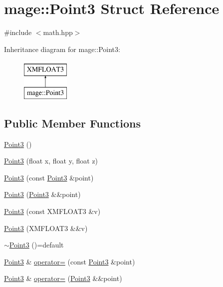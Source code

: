 \hypertarget{structmage_1_1_point3}{}\section{mage\+:\+:Point3 Struct Reference}
\label{structmage_1_1_point3}


{\ttfamily \#include $<$math.\+hpp$>$}

Inheritance diagram for mage\+:\+:Point3\+:\begin{figure}[H]
\begin{center}
\leavevmode
\includegraphics[height=2.000000cm]{structmage_1_1_point3}
\end{center}
\end{figure}
\subsection*{Public Member Functions}
\begin{DoxyCompactItemize}
\item 
\hyperlink{structmage_1_1_point3_a2675c303e54c6047520bc1a298c7fef1}{Point3} ()
\item 
\hyperlink{structmage_1_1_point3_a754210fa30befab6db5957a8d9b397f2}{Point3} (float x, float y, float z)
\item 
\hyperlink{structmage_1_1_point3_ad2e95e6eaa32339663e35f936990eb0c}{Point3} (const \hyperlink{structmage_1_1_point3}{Point3} \&point)
\item 
\hyperlink{structmage_1_1_point3_a3d10561285e01d03978e0d91fda6ff1d}{Point3} (\hyperlink{structmage_1_1_point3}{Point3} \&\&point)
\item 
\hyperlink{structmage_1_1_point3_ad67cb174e070f014472a57aa42b87f8d}{Point3} (const X\+M\+F\+L\+O\+A\+T3 \&v)
\item 
\hyperlink{structmage_1_1_point3_ad28d286384f8ce89c6bc25471ec78cff}{Point3} (X\+M\+F\+L\+O\+A\+T3 \&\&v)
\item 
\hyperlink{structmage_1_1_point3_a952151b6ff72b68569f95445c2ac2495}{$\sim$\+Point3} ()=default
\item 
\hyperlink{structmage_1_1_point3}{Point3} \& \hyperlink{structmage_1_1_point3_a53403b16c67a6c7d72910edaec04e371}{operator=} (const \hyperlink{structmage_1_1_point3}{Point3} \&point)
\item 
\hyperlink{structmage_1_1_point3}{Point3} \& \hyperlink{structmage_1_1_point3_a6889dad6ac4106bd9a52fcae4dfa401c}{operator=} (\hyperlink{structmage_1_1_point3}{Point3} \&\&point)
\end{DoxyCompactItemize}


